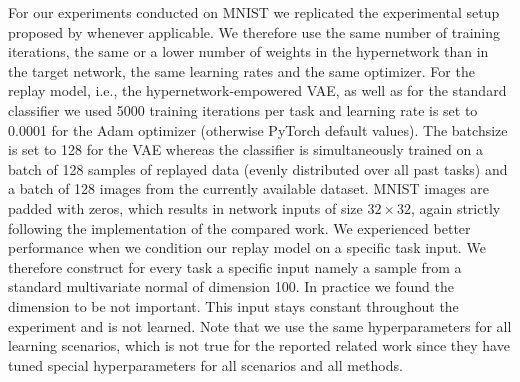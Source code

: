 \documentclass{article}
\begin{document}
For our experiments conducted on MNIST we replicated the experimental setup proposed by \cite{van_de_ven_three_2019} whenever applicable. We therefore use the same number of training iterations, the same or a lower number of weights in the hypernetwork than in the target network, the same learning rates and the same optimizer. For the replay model, i.e., the hypernetwork-empowered VAE, as well as for the standard classifier we used 5000 training iterations per task and learning rate is set to 0.0001 for the Adam optimizer (otherwise PyTorch default values). The batchsize is set to 128 for the VAE whereas the classifier is simultaneously trained on a batch of 128 samples of replayed data (evenly distributed over all past tasks) and a batch of 128 images from the currently available dataset.
MNIST images are padded with zeros, which results in network inputs of size $32 \times 32$, again strictly following the implementation of the compared work. We experienced better performance when we condition our replay model on a specific task input. We therefore construct for every task a specific input namely a sample from a standard multivariate normal of dimension 100. In practice we found the dimension to be not important. This input stays constant throughout the experiment and is not learned.
Note that we use the same hyperparameters for all learning scenarios, which is not true for the reported related work since they have tuned special hyperparameters for all scenarios and all methods.
\end{document}
